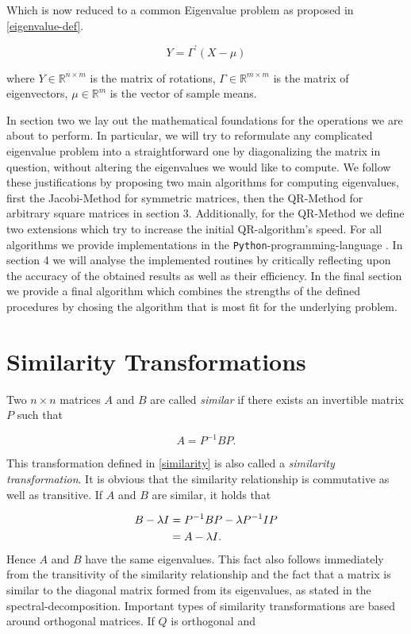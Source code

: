 \documentclass[12pt]{article}
\begin{document}
Which is now reduced to a common Eigenvalue problem as proposed in \ref{eigenvalue-def}.


\begin{equation}
\label{pca_sol}
	Y = \Gamma^{\prime} \left(X - \mu\right)
\end{equation}

where $Y \in \mathbb{R}^{n \times m}$ is the matrix of rotations, 
	  $\Gamma \in \mathbb{R}^{m \times m}$ is the matrix of eigenvectors,
	  $\mu \in \mathbb{R}^m$ is the vector of sample means. \cite{MVA}


In section two we lay out the mathematical foundations for the operations we are about to perform. In particular, we will try to reformulate any complicated eigenvalue problem into a straightforward one by diagonalizing the matrix in question, without altering the eigenvalues we would like to compute. We follow these justifications by proposing two main algorithms for computing eigenvalues, first the Jacobi-Method for symmetric matrices, then the QR-Method for arbitrary square matrices in section 3. Additionally, for the QR-Method we define two extensions which try to increase the initial QR-algorithm's speed.
For all algorithms we provide implementations in the \texttt{Python}-programming-language \cite{python, matplotlib, scipy}. In section 4 we will analyse the implemented routines by critically reflecting upon the accuracy of the obtained results as well as their efficiency. In the final section we provide a final algorithm which combines the strengths of the defined procedures by chosing the algorithm that is most fit for the underlying problem.
\section{Similarity Transformations}

Two $n \times n$ matrices $A$ and $B$ are called \textit{similar} if there exists an invertible matrix $P$ such that

\begin{equation}
\label{similarity}
A = P^{-1} B P.
\end{equation}

This transformation defined in \ref{similarity} is also called a \textit{similarity transformation}. It is obvious that the similarity relationship is commutative as well as transitive. If $A$ and $B$ are similar, it holds that

\begin{align*}
B - \lambda I &= P^{-1} B P - \lambda P^{-1} I P \notag \\
              &= A - \lambda I.
\end{align*}
 Hence $A$ and $B$ have the same eigenvalues. This fact also follows immediately from the transitivity of the similarity relationship and the fact that a matrix is similar to the diagonal matrix formed from its eigenvalues, as stated in the spectral-decomposition. Important types of similarity transformations are based around orthogonal matrices. If $Q$ is orthogonal and
 
\end{document}
